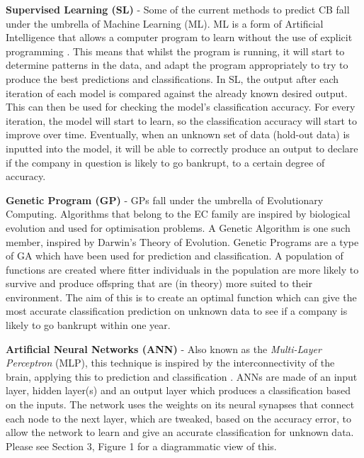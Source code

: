 \documentclass[11pt]{article}
\begin{document}
\textbf{Supervised Learning (SL)} - Some of the current methods to predict CB fall under the umbrella of Machine Learning (ML). ML is a form of Artificial Intelligence that allows a computer program to learn without the use of explicit programming \cite{ref-six}. This means that whilst the program is running, it will start to determine patterns in the data, and adapt the program appropriately to try to produce the best predictions and classifications.
In SL, the output after each iteration of each model is compared against the already known desired output. This can then be used for checking the model's classification accuracy. For every iteration, the model will start to learn, so the classification accuracy will start to improve over time. Eventually, when an unknown set of data (hold-out data) is inputted into the model, it will be able to correctly produce an output to declare if the company in question is likely to go bankrupt, to a certain degree of accuracy.

\textbf{Genetic Program (GP)} - GPs fall under the umbrella of Evolutionary Computing. Algorithms that belong to the EC family are inspired by biological evolution and used for optimisation problems. A Genetic Algorithm is one such member, inspired by Darwin's Theory of Evolution. Genetic Programs are a type of GA which have been used for prediction and classification. A population of functions are created where fitter individuals in the population are more likely to survive and produce offspring that are (in theory) more suited to their environment. The aim of this is to create an optimal function which can give the most accurate classification prediction on unknown data to see if a company is likely to go bankrupt within one year. 

\textbf{Artificial Neural Networks (ANN)} - Also known as the \textit{Multi-Layer Perceptron} (MLP),  this technique is inspired by the interconnectivity of the brain, applying this to prediction and classification \cite{ref-seven}. ANNs are made of an input layer, hidden layer(s) and an output layer which produces a classification based on the inputs. The network uses the weights on its neural synapses that connect each node to the next layer, which are tweaked, based on the accuracy error, to allow the network to learn and give an accurate classification for unknown data. Please see Section 3, Figure 1 for a diagrammatic view of this.
\\
\end{document}
